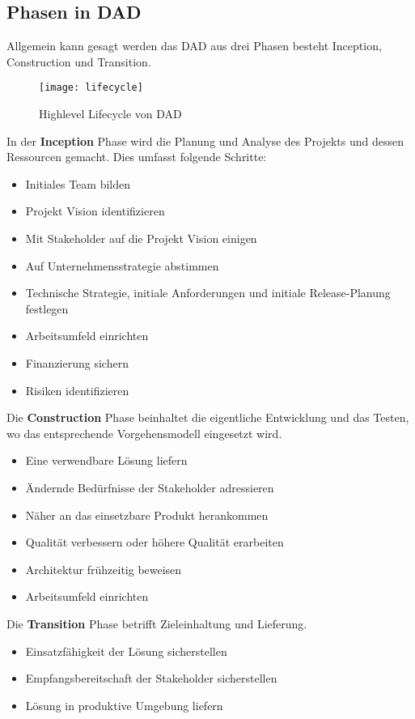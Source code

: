 \subsection{Phasen in DAD}
Allgemein kann gesagt werden das DAD aus drei Phasen besteht Inception, Construction und Transition.\smallskip
\begin{figure}[H]
	\centering
	\texttt{[image: lifecycle]}
	\caption{Highlevel Lifecycle von DAD}
	\label{fig:lifecycle}
\end{figure}\medskip
In der \textbf{Inception} Phase wird die Planung und Analyse des Projekts und dessen Ressourcen gemacht. Dies umfasst folgende Schritte:\smallskip
\begin{itemize}
	\item Initiales Team bilden
	\item Projekt Vision identifizieren
	\item Mit Stakeholder auf die Projekt Vision einigen
	\item Auf Unternehmensstrategie abstimmen
	\item Technische Strategie, initiale Anforderungen und initiale Release-Planung festlegen
	\item Arbeitsumfeld einrichten
	\item Finanzierung sichern
	\item Risiken identifizieren
\end{itemize}
\medskip
Die \textbf{Construction} Phase beinhaltet die eigentliche Entwicklung und das Testen, wo das entsprechende Vorgehensmodell eingesetzt wird.\smallskip
\begin{itemize}
	\item Eine verwendbare Lösung liefern
	\item Ändernde Bedürfnisse der Stakeholder adressieren 
	\item Näher an das einsetzbare Produkt herankommen
	\item Qualität verbessern oder höhere Qualität erarbeiten
	\item Architektur frühzeitig beweisen
	\item Arbeitsumfeld einrichten
\end{itemize}\medskip
Die \textbf{Transition} Phase betrifft Zieleinhaltung und Lieferung.
\begin{itemize}
	\item Einsatzfähigkeit der Lösung sicherstellen
	\item Empfangsbereitschaft der Stakeholder sicherstellen
	\item Lösung in produktive Umgebung liefern
\end{itemize}


